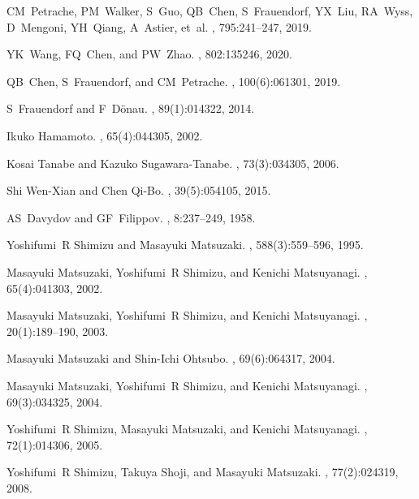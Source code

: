 \documentclass[myclassdoc,debug]{rjparticle}
\begin{document}
\begin{thebibliography}{99}
CM~Petrache, PM~Walker, S~Guo, QB~Chen, S~Frauendorf, YX~Liu, RA~Wyss,
  D~Mengoni, YH~Qiang, A~Astier, et~al.
, 795:241--247, 2019.

YK~Wang, FQ~Chen, and PW~Zhao.
, 802:135246, 2020.

QB~Chen, S~Frauendorf, and CM~Petrache.
, 100(6):061301, 2019.

S~Frauendorf and F~D{\"o}nau.
, 89(1):014322, 2014.

Ikuko Hamamoto.
, 65(4):044305, 2002.

Kosai Tanabe and Kazuko Sugawara-Tanabe.
, 73(3):034305, 2006.

Shi Wen-Xian and Chen Qi-Bo.
, 39(5):054105, 2015.

AS~Davydov and GF~Filippov.
, 8:237--249, 1958.

Yoshifumi~R Shimizu and Masayuki Matsuzaki.
, 588(3):559--596, 1995.

Masayuki Matsuzaki, Yoshifumi~R Shimizu, and Kenichi Matsuyanagi.
, 65(4):041303, 2002.

Masayuki Matsuzaki, Yoshifumi~R Shimizu, and Kenichi Matsuyanagi.
,
  20(1):189--190, 2003.

Masayuki Matsuzaki and Shin-Ichi Ohtsubo.
, 69(6):064317, 2004.

Masayuki Matsuzaki, Yoshifumi~R Shimizu, and Kenichi Matsuyanagi.
, 69(3):034325, 2004.

Yoshifumi~R Shimizu, Masayuki Matsuzaki, and Kenichi Matsuyanagi.
, 72(1):014306, 2005.

Yoshifumi~R Shimizu, Takuya Shoji, and Masayuki Matsuzaki.
, 77(2):024319, 2008.


\end{thebibliography}
\end{document}
